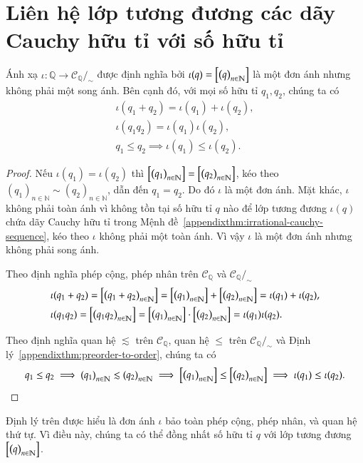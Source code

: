 \section{Liên hệ lớp tương đương các dãy Cauchy hữu tỉ với số hữu tỉ}

\begin{appendixthm}\label{appendixthm:embed-Q-into-quotient-set-of-rational-cauchy-sequences}
    Ánh xạ $\iota: \mathbb{Q}\to \mathscr{C}_{\mathbb{Q}}/_{\sim}$ được định nghĩa bởi $\iota(q) = \left[{\left({q}\right)}_{{n}\in\mathbb{N}}\right]$ là một đơn ánh nhưng không phải một song ánh. Bên cạnh đó, với mọi số hữu tỉ $q_{1}, q_{2}$, chúng ta có
    \[
        \begin{split}
            \iota(q_{1} + q_{2}) = \iota(q_{1}) + \iota(q_{2}), \\
            \iota(q_{1}q_{2}) = \iota(q_{1})\iota(q_{2}), \\
            q_{1}\leq q_{2} \implies \iota(q_{1})\leq \iota(q_{2}).
        \end{split}
    \]
\end{appendixthm}

\begin{proof}
    Nếu $\iota(q_{1}) = \iota(q_{2})$ thì $\left[{\left({q_{1}}\right)}_{{n}\in\mathbb{N}}\right] = \left[{\left({q_{2}}\right)}_{{n}\in\mathbb{N}}\right]$, kéo theo ${(q_{1})}_{n\in\mathbb{N}}\sim {(q_{2})}_{n\in\mathbb{N}}$, dẫn đến $q_{1} = q_{2}$. Do đó $\iota$ là một đơn ánh. Mặt khác, $\iota$ không phải toàn ánh vì không tồn tại số hữu tỉ $q$ nào để lớp tương đương $\iota(q)$ chứa dãy Cauchy hữu tỉ trong Mệnh đề~\ref{appendixthm:irrational-cauchy-sequence}, kéo theo $\iota$ không phải một toàn ánh. Vì vậy $\iota$ là một đơn ánh nhưng không phải song ánh.

    Theo định nghĩa phép cộng, phép nhân trên $\mathscr{C}_{\mathbb{Q}}$ và $\mathscr{C}_{\mathbb{Q}}/_{\sim}$
    \begin{align*}
         & \iota(q_{1} + q_{2}) = \left[{\left({q_{1} + q_{2}}\right)}_{{n}\in\mathbb{N}}\right] = \left[{\left({q_{1}}\right)}_{{n}\in\mathbb{N}}\right] + \left[{\left({q_{2}}\right)}_{{n}\in\mathbb{N}}\right] = \iota(q_{1}) + \iota(q_{2}), \\
         & \iota(q_{1}q_{2}) = \left[{\left({q_{1}q_{2}}\right)}_{{n}\in\mathbb{N}}\right] = \left[{\left({q_{1}}\right)}_{{n}\in\mathbb{N}}\right]\cdot\left[{\left({q_{2}}\right)}_{{n}\in\mathbb{N}}\right] = \iota(q_{1})\iota(q_{2}).
    \end{align*}

    Theo định nghĩa quan hệ $\lesssim$ trên $\mathscr{C}_{\mathbb{Q}}$, quan hệ $\leq$ trên $\mathscr{C}_{\mathbb{Q}}/_{\sim}$ và Định lý~\ref{appendixthm:preorder-to-order}, chúng ta có
    \[
        q_{1}\leq q_{2} \implies {(q_{1})}_{n\in\mathbb{N}}\lesssim {(q_{2})}_{n\in\mathbb{N}} \implies \left[{\left({q_{1}}\right)}_{{n}\in\mathbb{N}}\right] \leq \left[{\left({q_{2}}\right)}_{{n}\in\mathbb{N}}\right] \implies \iota(q_{1}) \leq \iota(q_{2}).
    \]
\end{proof}

Định lý trên được hiểu là đơn ánh $\iota$ bảo toàn phép cộng, phép nhân, và quan hệ thứ tự. Vì điều này, chúng ta có thể đồng nhất số hữu tỉ $q$ với lớp tương đương $\left[{\left({q}\right)}_{{n}\in\mathbb{N}}\right]$.
